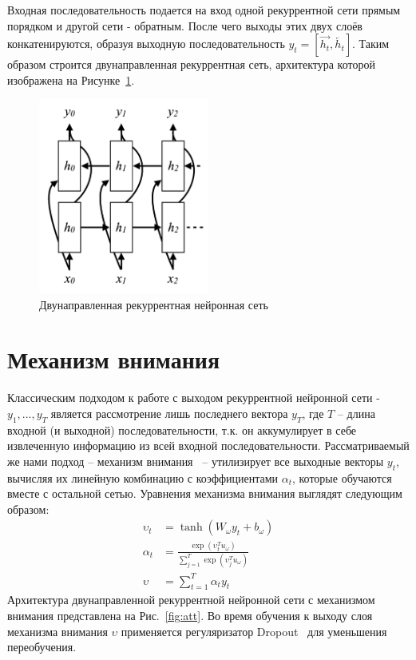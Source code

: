 Входная последовательность подается на вход одной рекуррентной сети прямым порядком и другой сети - обратным. После чего выходы этих двух слоёв конкатенируются, образуя выходную последовательность $y_{t} = \left[\overrightarrow{h_{t}},\overleftarrow{h_{t}}\right]$. Таким образом строится двунаправленная рекуррентная сеть, архитектура которой изображена на Рисунке~\ref{fig:birnn}.

\begin{figure}[H]
  \centering
  \includegraphics[width=0.5\textwidth]{images/birnn2_bin.png}
  \caption{Двунаправленная рекуррентная нейронная сеть}
  \label{fig:birnn}
\end{figure}
\section{Механизм внимания}
Классическим подходом к работе с выходом рекуррентной нейронной сети - $y_{1} ,..., y_{T} $ является рассмотрение лишь последнего вектора $y_{T}$, где $T$ -- длина входной (и выходной) последовательности, т.к. он аккумулирует в себе извлеченную информацию из всей входной последовательности. Рассматриваемый же нами подход -- механизм внимания~\cite{bahdanau} -- утилизирует все выходные векторы $y_{t}$, вычисляя их линейную комбинацию с коэффициентами $\alpha_{t}$, которые обучаются вместе с остальной сетью. Уравнения механизма внимания выглядят следующим образом:
	\begin{align}	
    \upsilon_{t}&=\tanh{(W_{\omega}y_{t}+b_{\omega})}\\
	\alpha_{t}&=\frac{\exp{(\upsilon_{t}^{T}u_{\omega})}}{\sum_{j=1}^{T}\exp{(\upsilon_{j}^{T}u_{\omega})}}\\
	\upsilon&=\sum_{t=1}^{T}\alpha_{t}y_{t}
	\end{align}	
Архитектура двунаправленной рекуррентной нейронной сети с механизмом внимания представлена на Рис.~\ref{fig:att}. Во время обучения к выходу слоя механизма внимания $\upsilon$ применяется регуляризатор Dropout~\cite{srivastava} для уменьшения переобучения.

